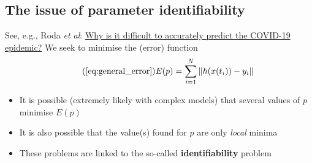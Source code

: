 \documentclass[aspectratio=169]{beamer}
\begin{document}

\subsection{The issue of parameter identifiability}

\begin{frame}{}
    See, e.g., Roda \emph{et al}: \href{https://doi.org/10.1016/j.idm.2020.03.001}{Why is it difficult to accurately predict the COVID-19 epidemic?}
    \vfill
    We seek to minimise the (error) function
    \begin{equation}\tag{\ref{eq:general_error}}
        E(p) = \sum_{i=1}^N \|h(x(t_i))-y_i\|
    \end{equation}
    \vfill
    \begin{itemize}
        \item It is possible (extremely likely with complex models) that several values of $p$ minimise $E(p)$
        \item It is also possible that the value(s) found for $p$ are only \emph{local} minima 
        \item These problems are linked to the so-called \textbf{identifiability} problem
    \end{itemize}
\end{frame}
\end{document}
